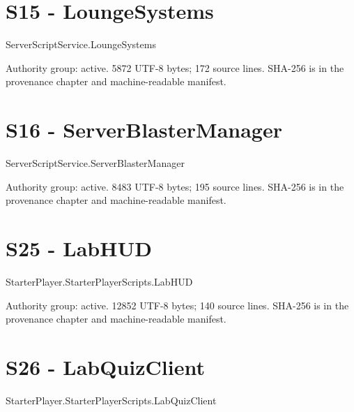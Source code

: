 \chapter{S15 - LoungeSystems}
\label{src:S15}
ServerScriptService.\allowbreak{}LoungeSystems

Authority group: active.\allowbreak{} 5872 UTF-8 bytes; 172 source lines.\allowbreak{} SHA-256 is in the provenance chapter and machine-readable manifest.\allowbreak{}

\begingroup{}
\endgroup
\chapter{S16 - ServerBlasterManager}
\label{src:S16}
ServerScriptService.\allowbreak{}ServerBlasterManager

Authority group: active.\allowbreak{} 8483 UTF-8 bytes; 195 source lines.\allowbreak{} SHA-256 is in the provenance chapter and machine-readable manifest.\allowbreak{}

\begingroup{}
\endgroup
\chapter{S25 - LabHUD}
\label{src:S25}
StarterPlayer.\allowbreak{}StarterPlayerScripts.\allowbreak{}LabHUD

Authority group: active.\allowbreak{} 12852 UTF-8 bytes; 140 source lines.\allowbreak{} SHA-256 is in the provenance chapter and machine-readable manifest.\allowbreak{}

\begingroup{}
\endgroup
\chapter{S26 - LabQuizClient}
\label{src:S26}
StarterPlayer.\allowbreak{}StarterPlayerScripts.\allowbreak{}LabQuizClient

